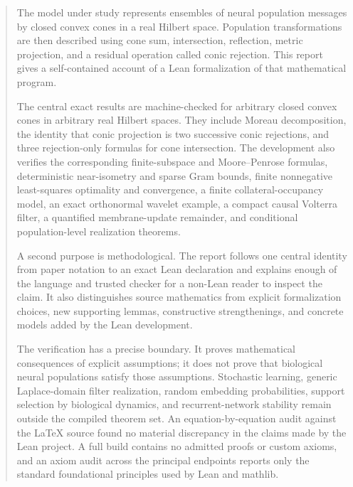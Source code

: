 \documentclass[11pt,a4paper]{article}
\begin{document}
\hypersetup{pageanchor=true}

\begin{abstract}
The model under study represents ensembles of neural population messages by
closed convex cones in a real Hilbert space. Population transformations are
then described using cone sum, intersection, reflection, metric projection,
and a residual operation called conic rejection. This report gives a
self-contained account of a Lean formalization of that mathematical program.

The central exact results are machine-checked for arbitrary closed convex
cones in arbitrary real Hilbert spaces. They include Moreau decomposition,
the identity that conic projection is two successive conic rejections, and
three rejection-only formulas for cone intersection. The development also
verifies the corresponding finite-subspace and Moore--Penrose formulas,
deterministic near-isometry and sparse Gram bounds, finite nonnegative
least-squares optimality and convergence, a finite collateral-occupancy
model, an exact orthonormal wavelet example, a compact causal Volterra
filter, a quantified membrane-update remainder, and conditional
population-level realization theorems.

A second purpose is methodological. The report follows one central identity
from paper notation to an exact Lean declaration and explains enough of the
language and trusted checker for a non-Lean reader to inspect the claim. It
also distinguishes source mathematics from explicit formalization choices,
new supporting lemmas, constructive strengthenings, and concrete models added
by the Lean development.

The verification has a precise boundary. It proves mathematical consequences
of explicit assumptions; it does not prove that biological neural
populations satisfy those assumptions. Stochastic learning, generic
Laplace-domain filter realization, random embedding probabilities, support
selection by biological dynamics, and recurrent-network stability remain
outside the compiled theorem set. An equation-by-equation audit against the
LaTeX source found no material discrepancy in the claims made by the Lean
project. A full build contains no admitted proofs or custom axioms, and an
axiom audit across the principal endpoints reports only the standard
foundational principles used by Lean and mathlib.
\end{abstract}

\begingroup
\small
\setlength{\parskip}{0pt}
\tableofcontents
\endgroup
\clearpage
\end{document}
